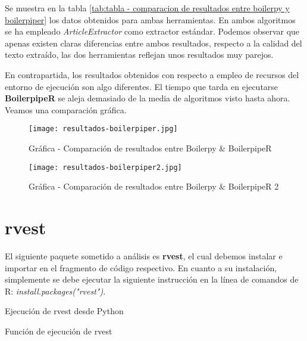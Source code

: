 Se muestra en la tabla \ref{tab:tabla - comparacion de resultados entre boilerpy y boilerpiper} los datos
obtenidos para ambas herramientas. En ambos algoritmos se ha empleado \emph{ArticleExtractor} como extractor
estándar. Podemos observar que apenas existen claras diferencias entre ambos resultados, respecto a la
calidad del texto extraído, las dos herramientas reflejan unos resultados muy parejos.

En contrapartida, los resultados obtenidos con respecto a empleo de recursos del entorno de ejecución son
algo diferentes. El tiempo que tarda en ejecutarse \textbf{BoilerpipeR} se aleja demasiado de la media de
algoritmos visto hasta ahora. Veamos una comparación gráfica.

\begin{figure}[tphb]
    \centering
    \texttt{[image: resultados-boilerpiper.jpg]}
    \caption{Gráfica - Comparación de resultados entre Boilerpy \& BoilerpipeR}
    \label{img:grafica - comparacion de resultados entre boilerpy y boilerpiper}
\end{figure}

\begin{figure}[tphb]
    \centering
    \texttt{[image: resultados-boilerpiper2.jpg]}
    \caption{Gráfica - Comparación de resultados entre Boilerpy \& BoilerpipeR 2}
    \label{img:grafica - comparacion de resultados entre boilerpy y boilerpiper 2}
\end{figure}

\section*{rvest}

El siguiente paquete sometido a análisis es \textbf{rvest}, el cual debemos instalar e importar en el
fragmento de código respectivo. En cuanto a su instalación, simplemente se debe ejecutar la siguiente
instrucción en la línea de comandos de R: \emph{install.packages("rvest")}.

\begin{codefloat}
    
    \caption{Ejecución de rvest desde Python}
    \label{cod:ejecucion de rvest desde python}
\end{codefloat}

\begin{codefloat}
    
    \caption{Función de ejecución de rvest}
    \label{cod:funcion de ejecucion de rvest}
\end{codefloat}

